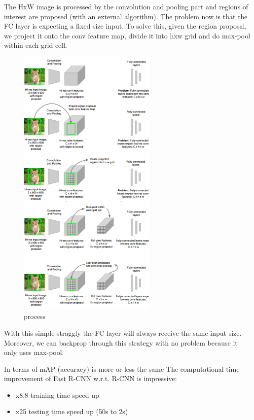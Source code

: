 The HxW image is processed by the convolution and pooling part and regions of interest are proposed (with an external algorithm). The problem now is that the FC layer is expecting a fixed size input. To solve this, given the region proposal, we project it onto the conv feature map, divide it into hxw grid and do max-pool within each grid cell.

\begin{figure}[h]
  \centering
  \includegraphics[width=0.6\textwidth]{Images/region_based_cnn/9.png}
  \caption{process}
\end{figure}

With this simple straggly the FC layer will always receive the same input size.  Moreover, we can backprop through this strategy with no problem because it only uses max-pool.

In terms of mAP (accuracy) is more or less the same
The computational time improvement of Fast R-CNN w.r.t. R-CNN is impressive:
\begin{itemize}
\item x8.8 training time speed up
\item x25 testing time speed up (50s to 2s)
\end{itemize}

